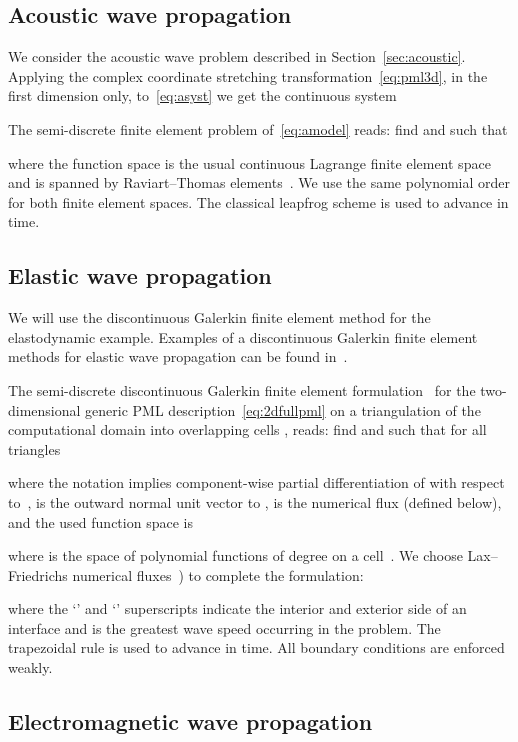 \documentclass[a4paper]{article}
\begin{document}
\subsection{Acoustic wave propagation}
\label{sec:acdiscr}

We consider the acoustic wave problem described in
Section~\ref{sec:acoustic}. Applying the complex coordinate stretching
transformation~\eqref{eq:pml3d}, in the first dimension only,
to~\eqref{eq:asyst} we get the continuous system

The semi-discrete finite element problem of~\eqref{eq:amodel} reads:
find  and  such that

where the function space  is the usual
continuous Lagrange finite element space and  is spanned by Raviart--Thomas
elements~\citep{raviart77thomas}. We use the same polynomial order for
both finite element spaces.  The classical leapfrog scheme is used to
advance in time.

\subsection{Elastic wave propagation}
\label{sec:eddiscr}

We will use the discontinuous Galerkin finite element method for the
elastodynamic example. Examples of a discontinuous Galerkin finite
element methods for elastic wave propagation can be found
in~\citep{boumatar12etall, etienne10etall}.

The semi-discrete discontinuous Galerkin finite element formulation~
for the two-dimensional generic PML description~\eqref{eq:2dfullpml}
on a triangulation  of the
computational domain  into  overlapping cells ,
reads: find  and  such that
for all triangles 

where the notation 
implies component-wise partial differentiation of  with
respect to~,  is the outward normal unit vector
to ,  is the numerical flux (defined
below),  and the used function space
is

where  is the space of polynomial functions of degree  on a cell~. We choose Lax--Friedrichs numerical
fluxes~\cite[p.~34]{hesthaven08warburton}) to complete the
formulation:

where the `' and `' superscripts indicate the interior and
exterior side of an interface and  is the greatest wave speed
occurring in the problem. The trapezoidal rule is used to advance in
time. All boundary conditions are enforced weakly.

\subsection{Electromagnetic wave propagation}
\label{sec:em_discr}
\end{document}
